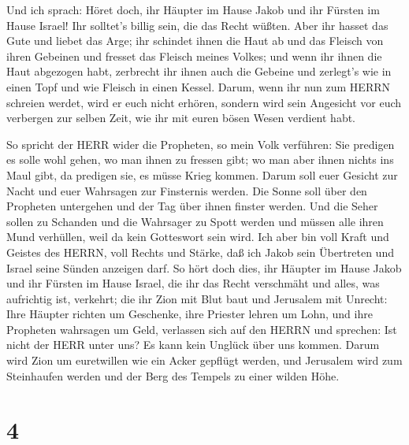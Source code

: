  Und ich sprach: Höret doch, ihr Häupter im Hause Jakob und
ihr Fürsten im Hause Israel! Ihr solltet's billig sein, die das Recht
wüßten.  Aber ihr hasset das Gute und liebet das Arge; ihr
schindet ihnen die Haut ab und das Fleisch von ihren Gebeinen
 und fresset das Fleisch meines Volkes; und wenn ihr ihnen
die Haut abgezogen habt, zerbrecht ihr ihnen auch die Gebeine und
zerlegt's wie in einen Topf und wie Fleisch in einen Kessel.
 Darum, wenn ihr nun zum HERRN schreien werdet, wird er euch
nicht erhören, sondern wird sein Angesicht vor euch verbergen zur selben
Zeit, wie ihr mit euren bösen Wesen verdient habt.

 So spricht der HERR wider die Propheten, so mein Volk
verführen: Sie predigen es solle wohl gehen, wo man ihnen zu fressen
gibt; wo man aber ihnen nichts ins Maul gibt, da predigen sie, es müsse
Krieg kommen.  Darum soll euer Gesicht zur Nacht und euer
Wahrsagen zur Finsternis werden. Die Sonne soll über den Propheten
untergehen und der Tag über ihnen finster werden.  Und die
Seher sollen zu Schanden und die Wahrsager zu Spott werden und müssen
alle ihren Mund verhüllen, weil da kein Gotteswort sein wird.
 Ich aber bin voll Kraft und Geistes des HERRN, voll Rechts
und Stärke, daß ich Jakob sein Übertreten und Israel seine Sünden
anzeigen darf.  So hört doch dies, ihr Häupter im Hause
Jakob und ihr Fürsten im Hause Israel, die ihr das Recht verschmäht und
alles, was aufrichtig ist, verkehrt;  die ihr Zion mit Blut
baut und Jerusalem mit Unrecht:  Ihre Häupter richten um
Geschenke, ihre Priester lehren um Lohn, und ihre Propheten wahrsagen um
Geld, verlassen sich auf den HERRN und sprechen: Ist nicht der HERR
unter uns? Es kann kein Unglück über uns kommen.  Darum
wird Zion um euretwillen wie ein Acker gepflügt werden, und Jerusalem
wird zum Steinhaufen werden und der Berg des Tempels zu einer wilden
Höhe.

\hypertarget{section-3}{%
\section{4}\label{section-3}}


